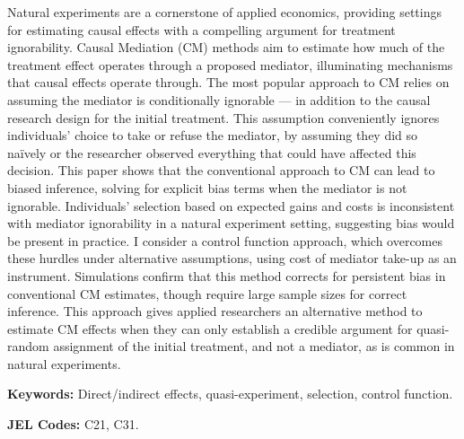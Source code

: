 \noindent
Natural experiments are a cornerstone of applied economics, providing settings for estimating causal effects with a compelling argument for treatment ignorability.
Causal Mediation (CM) methods aim to estimate how much of the treatment effect operates through a proposed mediator, illuminating mechanisms that causal effects operate through.
The most popular approach to CM relies on assuming the mediator is conditionally ignorable --- in addition to the causal research design for the initial treatment.
This assumption conveniently ignores individuals' choice to take or refuse the mediator, by assuming they did so na\"ively or the researcher observed everything that could have affected this decision.
This paper shows that the conventional approach to CM can lead to biased inference, solving for explicit bias terms when the mediator is not ignorable.
Individuals' selection based on expected gains and costs is inconsistent with mediator ignorability in a natural experiment setting, suggesting bias would be present in practice.
I consider a control function approach, which overcomes these hurdles under alternative assumptions, using cost of mediator take-up as an instrument.
Simulations confirm that this method corrects for persistent bias in conventional CM estimates, though require large sample sizes for correct inference.
This approach gives applied researchers an alternative method to estimate CM effects when they can only establish a credible argument for quasi-random assignment of the initial treatment, and not a mediator, as is common in natural experiments.

\vspace{0.5cm}
\noindent
\textbf{Keywords:}
Direct/indirect effects, quasi-experiment, selection, control function.

\vspace{0.1cm}
\noindent
\textbf{JEL Codes:}
C21, C31.
